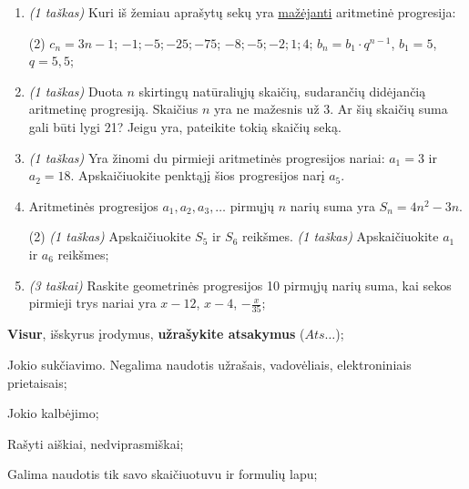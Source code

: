 \documentclass[a4paper]{article}
\begin{document}
\begin{enumerate}
      \item \textit{(1 taškas)} Kuri iš žemiau aprašytų sekų yra
            \underline{mažėjanti} aritmetinė progresija:
            \begin{tasks}[item-format={\normalfont}, after-item-skip=2mm,
                        label=\Alph*, label-format={\bfseries}](2)
                  \task $c_n = 3n-1$;
                  \task $-1; -5; -25; -75$;
                  \task $-8; -5; -2; 1; 4$;
                  \task $b_n=b_1\cdot q^{n-1}$, $b_1 = 5$, $q = 5,5$;
            \end{tasks}
      \item \textit{(1 taškas)}  Duota $n$ skirtingų natūraliųjų skaičių,
            sudarančių didėjančią
            aritmetinę progresiją. Skaičius $n$ yra ne mažesnis už 3. Ar šių
            skaičių suma
            gali būti lygi 21? Jeigu yra, pateikite tokią skaičių seką.
      \item \textit{(1 taškas)}  Yra žinomi du pirmieji aritmetinės progresijos
            nariai: $a_1 = 3$ ir $a_2 = 18$. Apskaičiuokite penktąjį šios
            progresijos narį
            $a_5$.
      \item Aritmetinės progresijos $a_1, a_2, a_3, \ldots$ pirmųjų $n$ narių
            suma yra $S_{n} = 4n^2-3n$.
            \begin{tasks}[item-format={\normalfont}, after-item-skip=2mm](2)
                  \task \textit{(1 taškas)} Apskaičiuokite $S_5$ ir $S_6$
                  reikšmes.
                  \task \textit{(1 taškas)} Apskaičiuokite $a_1$ ir $a_6$
                  reikšmes;
            \end{tasks}
      \item \textit{(3 taškai)} Raskite geometrinės progresijos 10 pirmųjų
            narių
            suma, kai sekos pirmieji trys nariai yra $x-12$, $x-4$,
            $-\frac{x}{35}$;
\end{enumerate}

\begin{small}
      \begin{enumerate*}[label={(\arabic*)}]
            \item \textbf{Visur}, išskyrus įrodymus, \textbf{užrašykite
                  atsakymus} ($Ats\ldots$);
            \item Jokio sukčiavimo. Negalima naudotis užrašais, vadovėliais,
            elektroniniais prietaisais;
            \item Jokio kalbėjimo;
            \item Rašyti aiškiai, nedviprasmiškai;
            \item Galima naudotis tik savo skaičiuotuvu ir formulių lapu;
      \end{enumerate*}
\end{small}
\end{document}
